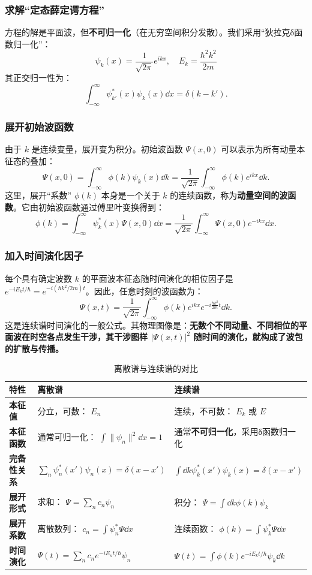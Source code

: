 \subsubsection{求解“定态薛定谔方程”}
方程的解是平面波，但\textbf{不可归一化}（在无穷空间积分发散）。我们采用“狄拉克δ函数归一化”：
\[
\psi_k(x) = \frac{1}{\sqrt{2\pi}} e^{ikx}, \quad E_k = \frac{\hbar^2 k^2}{2m}
\]
其正交归一性为：
\[
\int_{-\infty}^{\infty} \psi_{k'}^*(x) \psi_k(x) \dd{x} = \delta(k - k').
\]

\subsubsection{ 展开初始波函数}
由于 \(k\) 是连续变量，展开变为积分。初始波函数 \(\Psi(x, 0)\) 可以表示为所有动量本征态的叠加：
\[
\Psi(x, 0) = \int_{-\infty}^{\infty} \phi(k) \psi_k(x) \dd{k} = \frac{1}{\sqrt{2\pi}} \int_{-\infty}^{\infty} \phi(k) e^{ikx} \dd{k}.
\]
这里，展开“系数” \(\phi(k)\) 本身是一个关于 \(k\) 的连续函数，称为\textbf{动量空间的波函数}。它由初始波函数通过傅里叶变换得到：
\[
\phi(k) = \int_{-\infty}^{\infty} \psi_k^*(x) \Psi(x, 0) \dd{x} = \frac{1}{\sqrt{2\pi}} \int_{-\infty}^{\infty} \Psi(x, 0) e^{-ikx} \dd{x}.
\]

\subsubsection{加入时间演化因子}
每个具有确定波数 \(k\) 的平面波本征态随时间演化的相位因子是 \(e^{-i E_k t / \hbar} = e^{-i (\hbar k^2 / 2m) t}\)。因此，任意时刻的波函数为：
\[
\boxed{\Psi(x, t) = \frac{1}{\sqrt{2\pi}} \int_{-\infty}^{\infty} \phi(k) e^{i k x} e^{-i \frac{\hbar k^2}{2m} t} \dd{k}}.
\]
这是连续谱时间演化的一般公式。其物理图像是：\textbf{无数个不同动量、不同相位的平面波在时空各点发生干涉，其干涉图样 \(|\Psi(x, t)|^2\) 随时间的演化，就构成了波包的扩散与传播。}

\begin{table}[h!]
	\centering
	\caption{离散谱与连续谱的对比}
	\begin{tabular}{p{0.2\linewidth} p{0.4\linewidth} p{0.41\linewidth}}
		\toprule
		\textbf{特性} & \textbf{离散谱} & \textbf{连续谱} \\
		\midrule
		\textbf{本征值} & 分立，可数： \(E_n\) & 连续，不可数： \(E_k\) 或 \(E\) \\
		\textbf{本征函数} & 通常可归一化： \(\int \|\psi_n\|^2 \dd{x} = 1\) & 通常\textbf{不可归一化}，采用δ函数归一化 \\
		\textbf{完备性关系} & \(\sum_n \psi_n^*(x') \psi_n(x) = \delta(x-x')\) & \(\int \dd{k}  \psi_k^*(x') \psi_k(x) = \delta(x-x')\) \\
		\textbf{展开形式} & 求和： \(\Psi = \sum_n c_n \psi_n\) & 积分： \(\Psi = \int \dd{k}  \phi(k) \psi_k\) \\
		\textbf{展开系数} & 离散数列： \(c_n = \int \psi_n^* \Psi \dd{x}\) & 连续函数： \(\phi(k) = \int \psi_k^* \Psi \dd{x}\) \\
		\textbf{时间演化} & \(\Psi(t) = \sum_n c_n e^{-iE_n t/\hbar} \psi_n\) & \(\Psi(t) = \int \phi(k) e^{-iE_k t/\hbar} \psi_k \dd{k}\) \\
		\bottomrule
	\end{tabular}
\end{table}

